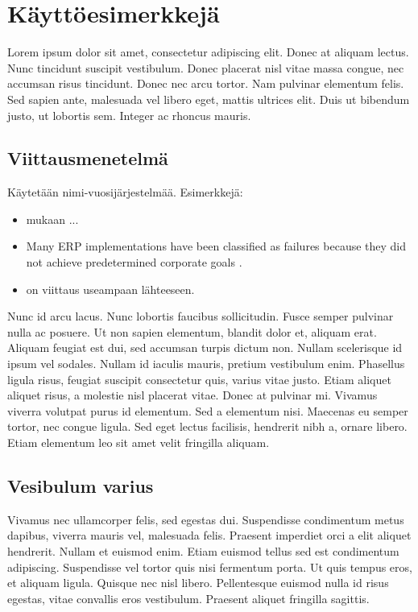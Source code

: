 \chapter{Käyttöesimerkkejä}
Lorem ipsum dolor sit amet, consectetur adipiscing elit. Donec at aliquam lectus. Nunc tincidunt suscipit vestibulum. Donec placerat nisl vitae massa congue, nec accumsan risus tincidunt. Donec nec arcu tortor. Nam pulvinar elementum felis. Sed sapien ante, malesuada vel libero eget, mattis ultrices elit. Duis ut bibendum justo, ut lobortis sem. Integer ac rhoncus mauris.

\section{Viittausmenetelmä}

Käytetään nimi-vuosijärjestelmää. Esimerkkejä:

\begin{itemize}
	\item \cite[s.~32]{basar1995dynamic} mukaan ...
	\item Many ERP implementations have been classified as failures because they did not achieve predetermined corporate goals \cite{umble2003enterprise}.
	\item \cite{lehman2014biblatex,knuth1973fundamental} on viittaus useampaan lähteeseen.
	
\end{itemize}

Nunc id arcu lacus. Nunc lobortis faucibus sollicitudin. Fusce semper pulvinar nulla ac posuere. Ut non sapien elementum, blandit dolor et, aliquam erat. Aliquam feugiat est dui, sed accumsan turpis dictum non. Nullam scelerisque id ipsum vel sodales. Nullam id iaculis mauris, pretium vestibulum enim. Phasellus ligula risus, feugiat suscipit consectetur quis, varius vitae justo. Etiam aliquet aliquet risus, a molestie nisl placerat vitae. Donec at pulvinar mi. Vivamus viverra volutpat purus id elementum. Sed a elementum nisi. Maecenas eu semper tortor, nec congue ligula. Sed eget lectus facilisis, hendrerit nibh a, ornare libero. Etiam elementum leo sit amet velit fringilla aliquam.

\section{Vesibulum varius}

Vivamus nec ullamcorper felis, sed egestas dui. Suspendisse condimentum metus dapibus, viverra mauris vel, malesuada felis. Praesent imperdiet orci a elit aliquet hendrerit. Nullam et euismod enim. Etiam euismod tellus sed est condimentum adipiscing. Suspendisse vel tortor quis nisi fermentum porta. Ut quis tempus eros, et aliquam ligula. Quisque nec nisl libero. Pellentesque euismod nulla id risus egestas, vitae convallis eros vestibulum. Praesent aliquet fringilla sagittis.

